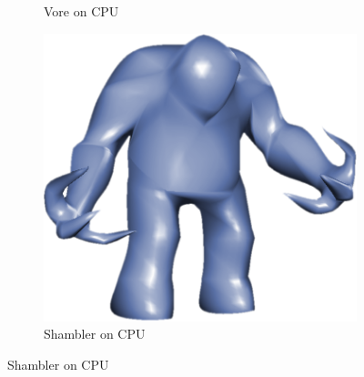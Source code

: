 \begin{figure}
\begin{subfigure}[b]{0.2\textwidth}
		\caption{Vore on CPU}
		\label{fig:results:cpugpu:cpuVore}
	\end{subfigure}	
	\hspace{0.1\textwidth}
	\begin{subfigure}[b]{0.2\textwidth}
		\centering
		\includegraphics[width=\textwidth]{content/img/results/cpugpu/shamblercpu.png}
		\caption{Shambler on CPU}
		\label{fig:results:cpugpu:cpuShambler}
	\end{subfigure}		


\end{figure}
